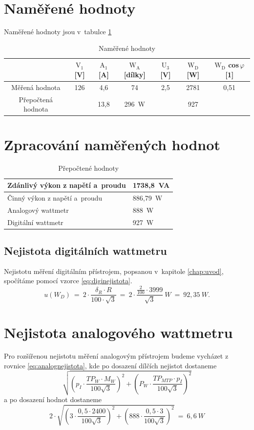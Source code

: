 \documentclass[a4paper,12pt]{article}   %
\begin{document}
\section{Naměřené hodnoty}
Naměřené hodnoty jsou v~tabulce \ref{tab:nam}
\begin{table}
  \centering
  \begin{tabular}{|c|c|c|c|c|c|c|}
    \hline
    &$\textrm{V}_\textrm{1}$[V]&$\textrm{A}_\textrm{1} $[A]&$\textrm{W}_\textrm{A} $[dílky]&$\textrm{U}_\textrm{3}$[V]&$\textrm{W}_\textrm{D}$ [W]&$\textrm{W}_\textrm{D}$ cos\,$\varphi$[1]\\\hline\hline
    Měřená hodnota&126&4,6&74&2,5&2781&0,51\\\hline
    Přepočtená hodnota&&13,8&296~W&&927&\\\hline
  \end{tabular}
  \caption{Naměřené hodnoty}
  \label{tab:nam}
\end{table}




\section{Zpracování naměřených hodnot}

\begin{table}[h!]
  \centering
  \begin{tabular}{|l|l|}
    \hline
    Zdánlivý výkon z napětí a~proudu &1738,8~VA\\\hline
    Činný výkon z napětí a~proudu &886,79~W\\\hline
    Analogový wattmetr &888~W\\\hline
    Digitální wattmetr &927~W\\\hline
  \end{tabular}
  \caption{Přepočtené hodnoty}
  \label{tab:spocteno}
\end{table}
\subsection{Nejistota digitálních wattmetru}
Nejistotu měření digitálním přístrojem, popsanou v~kapitole \ref{chap:uvod}, spočítáme pomocí vzorce \ref{eq:diginejistota}.
\begin{equation*}
  u(W_D)~=~2\cdot\frac{\delta_R\cdot R}{100\cdot\sqrt{3}}~=~2\cdot \frac{\frac{2}{100}\cdot 3999}{\sqrt{3}}~W~=~92,35~W.
\end{equation*}
\section{Nejistota analogového wattmetru}
Pro rozšířenou nejistotu měření analogovým přístrojem budeme vycházet z rovnice \ref{eq:analognejistota}, kde po dosazení dílčích nejistot dostaneme
\begin{equation*}
  \sqrt{\left(p_I \cdot \frac{TP_W\cdot M_W}{100\sqrt{3}}\right)^2 + \left(P_W \cdot \frac{TP_{MTP} \cdot p_I}{100\sqrt{3}}\right)^2}
\end{equation*}
a po dosazení hodnot dostaneme
\begin{equation*}
  2\cdot\sqrt{\left(3 \cdot \frac{0,5\cdot 2400}{100\sqrt{3}}\right)^2 + \left(888 \cdot \frac{0,5 \cdot 3}{100\sqrt{3}}\right)^2}~=~6,6~W
\end{equation*}
\end{document}
